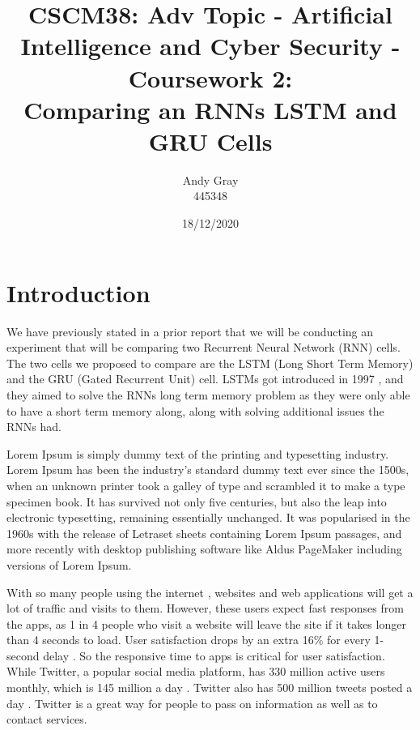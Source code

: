 \documentclass[a4paper,10pt]{article}
\begin{document}
\title{CSCM38: Adv Topic - Artificial Intelligence and Cyber Security - Coursework 2: \\ Comparing an RNNs LSTM and GRU Cells}
\author{Andy Gray\\445348}
\date{18/12/2020}

\maketitle

\section{Introduction}
\label{sec:intro}
	We have previously stated in a prior report that we will be conducting an experiment that will be comparing two Recurrent Neural Network (RNN) cells. The two cells we proposed to compare are the LSTM (Long Short Term Memory) and the GRU (Gated Recurrent Unit) cell. LSTMs got introduced in 1997 \cite{hochreiter1997long}, and they aimed to solve the RNNs long term memory problem as they were only able to have a short term memory along, along with solving additional issues the RNNs had. 

	Lorem Ipsum is simply dummy text of the printing and typesetting industry. Lorem Ipsum has been the industry's standard dummy text ever since the 1500s, when an unknown printer took a galley of type and scrambled it to make a type specimen book. It has survived not only five centuries, but also the leap into electronic typesetting, remaining essentially unchanged. It was popularised in the 1960s with the release of Letraset sheets containing Lorem Ipsum passages, and more recently with desktop publishing software like Aldus PageMaker including versions of Lorem Ipsum.

	With so many people using the internet \cite{internet_facts}, websites and web applications will get a lot of traffic and visits to them. However, these users expect fast responses from the apps, as 1 in 4 people who visit a website will leave the site if it takes longer than 4 seconds to load. User satisfaction drops by an extra 16\% for every 1-second delay \cite{internet_speed}. So the responsive time to apps is critical for user satisfaction. While Twitter, a popular social media platform, has 330 million active users monthly, which is 145 million a day \cite{twitter_facts}.  Twitter also has 500 million tweets posted a day \cite{twitter_facts}. Twitter is a great way for people to pass on information as well as to contact services.
	
\end{document}
